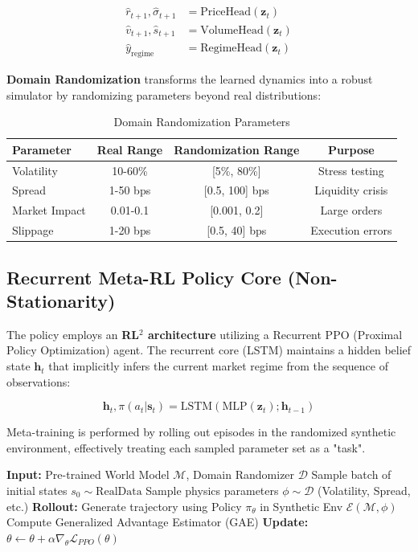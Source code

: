 \documentclass[11pt]{article}
\begin{document}
\begin{align}
    \hat{r}_{t+1}, \hat{\sigma}_{t+1} &= \text{PriceHead}(\mathbf{z}_t) \\
    \hat{v}_{t+1}, \hat{s}_{t+1} &= \text{VolumeHead}(\mathbf{z}_t) \\
    \hat{y}_{\text{regime}} &= \text{RegimeHead}(\mathbf{z}_t)
\end{align}

\textbf{Domain Randomization} transforms the learned dynamics into a robust simulator by randomizing parameters beyond real distributions:

\begin{table}[h]
\centering
\begin{tabular}{@{}lccc@{}}
\toprule
Parameter & Real Range & Randomization Range & Purpose \\
\midrule
Volatility & 10-60\% & [5\%, 80\%] & Stress testing \\
Spread & 1-50 bps & [0.5, 100] bps & Liquidity crisis \\
Market Impact & 0.01-0.1 & [0.001, 0.2] & Large orders \\
Slippage & 1-20 bps & [0.5, 40] bps & Execution errors \\
\bottomrule
\end{tabular}
\caption{Domain Randomization Parameters}
\label{tab:dr}
\end{table}

\subsection{Recurrent Meta-RL Policy Core (Non-Stationarity)}

The policy employs an \textbf{RL$^2$ architecture} utilizing a Recurrent PPO (Proximal Policy Optimization) agent. The recurrent core (LSTM) maintains a hidden belief state $\mathbf{h}_t$ that implicitly infers the current market regime from the sequence of observations:

\begin{equation}
    \mathbf{h}_t, \pi(a_t|\mathbf{s}_t) = \text{LSTM}(\text{MLP}(\mathbf{z}_t); \mathbf{h}_{t-1})
\end{equation}

Meta-training is performed by rolling out episodes in the randomized synthetic environment, effectively treating each sampled parameter set as a "task".

\begin{algorithm}[h]
\caption{Meta-RL Training (RL$^2$ / Recurrent PPO)}
\begin{algorithmic}
\STATE \textbf{Input:} Pre-trained World Model $\mathcal{M}$, Domain Randomizer $\mathcal{D}$
    \STATE Sample batch of initial states $s_0 \sim \text{RealData}$
    \STATE Sample physics parameters $\phi \sim \mathcal{D}$ (Volatility, Spread, etc.)
    \STATE \textbf{Rollout:} Generate trajectory using Policy $\pi_\theta$ in Synthetic Env $\mathcal{E}(\mathcal{M}, \phi)$
    \STATE Compute Generalized Advantage Estimator (GAE)
    \STATE \textbf{Update:} $\theta \gets \theta + \alpha \nabla_\theta \mathcal{L}_{PPO}(\theta)$
\ENDFOR
\end{algorithmic}
\end{algorithm}
\end{document}
